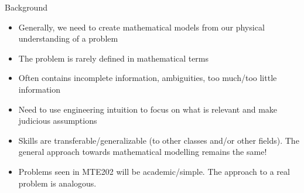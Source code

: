 \documentclass{beamer}
\begin{document}
\begin{frame}{Background}
\begin{itemize}
\item Generally, we need to create mathematical models from our physical understanding of a problem
\item The problem is rarely defined in mathematical terms
\item Often contains incomplete information, ambiguities, too much/too little information 
\item Need to use engineering intuition to focus on what is relevant and make judicious assumptions
\item Skills are transferable/generalizable (to other classes and/or other fields). The general approach towards mathematical modelling remains the same!
\item Problems seen in MTE202 will be academic/simple. The approach to a real problem is analogous.
\end{itemize}
\end{frame}



%
\end{document}
